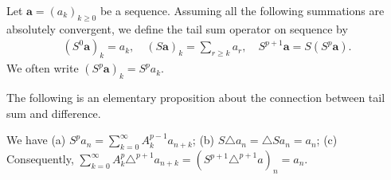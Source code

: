 
\begin{definition}
  Let $\bm{a} = (a_k)_{k\geq 0}$ be a sequence.
  Assuming all the following summations are absolutely convergent,
  we define the tail sum operator on sequence by
  \begin{align}
  (S^0 \bm{a}) _k = a_k,\quad
    (S \bm{a})_k = \sum_{r \geq k} a_r,\quad
    S^{p+1} \bm{a} = S(S^{p}\bm{a}).
  \end{align}
  We often write $(S^{p} \bm{a})_k = S^p a_k$.
\end{definition}

The following is an elementary proposition about the connection between tail sum and difference.
\begin{proposition}
  \label{prop:TailSumDifference}
  We have (a) $S^p a_n = \sum_{k=0}^{\infty} A^{p-1}_k a_{n+k}$;
  (b) $S\triangle a_n = \triangle S a_n = a_n$;
  (c) Consequently, $\sum_{k=0}^{\infty} A^{p}_k \triangle^{p+1} a_{n+k} = (S^{p+1} \triangle^{p+1} a)_{n} = a_n$.

\end{proposition}

